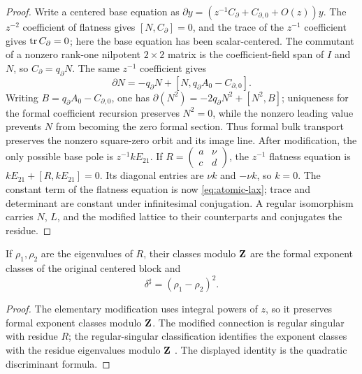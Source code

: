 \begin{proof}
Write a centered base equation as
\(\partial y=(z^{-1}C_\partial+C_{\partial,0}+O(z))y\).  The
\(z^{-2}\) coefficient of flatness gives \([N,C_\partial]=0\), and the trace
of the \(z^{-1}\) coefficient gives \(\operatorname{tr} C_\partial=0\); here the base
equation has been scalar-centered.  The commutant of a nonzero rank-one
nilpotent \(2\times2\) matrix is the coefficient-field span of \(I\) and
\(N\), so \(C_\partial=q_\partial N\).  The same \(z^{-1}\) coefficient gives
\[
 \partial N=-q_\partial N+
 [N,q_\partial A_0-C_{\partial,0}].
\]
Writing \(B=q_\partial A_0-C_{\partial,0}\), one has
\(\partial(N^2)=-2q_\partial N^2+[N^2,B]\); uniqueness for the formal
coefficient recursion preserves \(N^2=0\), while the nonzero leading value
prevents \(N\) from becoming the zero formal section.  Thus formal bulk
transport preserves the nonzero square-zero orbit and its
image line.  After modification, the only possible base
pole is \(z^{-1}kE_{21}\).  If
\(R=\left(\begin{smallmatrix}a&\nu\\c&d\end{smallmatrix}\right)\), the
\(z^{-1}\) flatness equation is
\(kE_{21}+[R,kE_{21}]=0\).  Its diagonal entries are \(\nu k\) and
\(-\nu k\), so \(k=0\).  The constant term of the flatness equation is now
\eqref{eq:atomic-lax}; trace and determinant are constant under infinitesimal
conjugation.  A regular isomorphism carries \(N\), \(L\), and the modified
lattice to their counterparts and conjugates the residue.
\end{proof}

\begin{proposition}
\label{prop:residue-discriminant-exponents}
%
%
%
If \(\rho_1,\rho_2\) are the eigenvalues of \(R\), their classes modulo
\(\mathbf Z\) are the formal exponent classes of the original centered block and
\[
 \delta^\sharp=(\rho_1-\rho_2)^2.
\]
\end{proposition}

\begin{proof}
The elementary modification uses integral powers of \(z\), so it preserves
formal exponent classes modulo \(\mathbf Z\).  The modified connection is regular
singular with residue \(R\); the regular-singular classification identifies
the exponent classes with the residue eigenvalues modulo \(\mathbf Z\)
\cite[Chapter~3]{PutSinger}.  The displayed identity is the quadratic
discriminant formula.
\end{proof}

